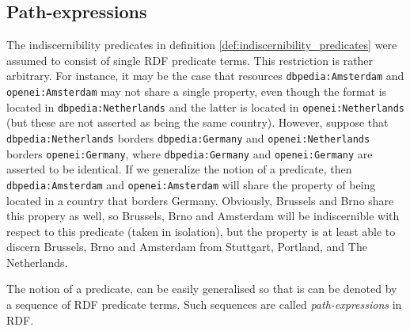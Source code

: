 \subsection{Path-expressions}
\label{sec:path_expressions}

The indiscernibility predicates in
  definition \ref{def:indiscernibility_predicates}
  were assumed to consist of single RDF predicate terms.
This restriction is rather arbitrary.
For instance,
  it may be the case that resources {\small \texttt{dbpedia:Amsterdam}}
  and {\small \texttt{openei:Amsterdam}} may not share a single property,
  even though the format is located in {\small \texttt{dbpedia:Netherlands}}
  and the latter is located in {\small \texttt{openei:Netherlands}}
  (but these are not asserted as being the same country).
However, suppose that {\small \texttt{dbpedia:Netherlands}}
  borders {\small \texttt{dbpedia:Germany}}
  and {\small \texttt{openei:Netherlands}}
  borders {\small \texttt{openei:Germany}},
  where {\small \texttt{dbpedia:Germany}} and
  {\small \texttt{openei:Germany}} are asserted to be identical.
If we generalize the notion of a predicate,
  then {\small \texttt{dbpedia:Amsterdam}} and
  {\small \texttt{openei:Amsterdam}} will share the property
  of being located in a country that borders Germany.
Obviously, Brussels and Brno share this propery as well,
  so Brussels, Brno and Amsterdam will be indiscernible with respect to
  this predicate (taken in isolation), but the property is at least
  able to discern Brussels, Brno and Amsterdam from
  Stuttgart, Portland, and The Netherlands.

The notion of a predicate, can be easily generalised
  so that is can be denoted by a sequence of RDF predicate terms.
Such sequences are called \emph{path-expressions} in RDF. 

